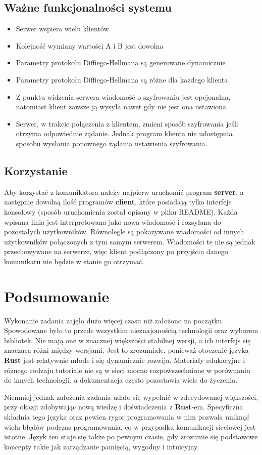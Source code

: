 \documentclass[11pt]{article}
\begin{document}
\subsection{Ważne funkcjonalności systemu}

\begin{itemize}
    \item Serwer wspiera wielu klientów
    \item Kolejność wymiany wartości A i B jest dowolna
    \item Parametry protokołu Diffiego-Hellmana są generowane dynamicznie
    \item Parametry protokołu Diffiego-Hellmana są różne dla każdego klienta
    \item Z punktu widzenia serwera wiadomość o szyfrowaniu jest opcjonalna, natomiast klient zawsze ją wysyła nawet gdy nie jest ona ustawiona
    \item Serwer, w trakcie połączenia z klientem, zmieni sposób szyfrowania jeśli otrzyma odpowiednie żądanie. Jednak program klienta nie udostępnia sposobu wysłania ponownego żądania ustawienia szyfrowania. 
\end{itemize}

\subsection{Korzystanie}

Aby korzystać z komunikatora należy najpierw uruchomić program \textbf{server}, a następnie dowolną ilość programów \textbf{client}, które posiadają tylko interfejs konsolowy (sposób uruchomienia został opisany w pliku README). Każda wpisana linia jest interpretowana jako nowa wiadomość i rozsyłana do pozostałych użytkowników. Równolegle są pokazywane wiadomości od innych użytkowników połączonych z tym samym serwerem. Wiadomości te nie są jednak przechowywane na serwerze, więc klient podłączony po przyjściu danego komunikatu nie będzie w stanie go otrzymać.

\section{Podsumowanie}

Wykonanie zadania zajęło dużo więcej czasu niż założono na początku. Spowodowane było to przede wszystkim nieznajomością technologii oraz wyborem bibliotek. Nie mają one w znacznej większości stabilnej wersji, a ich interfejs się znacząca różni między wersjami. Jest to zrozumiałe, ponieważ otoczenie języka \textbf{Rust} jest relatywnie młode i się dynamicznie rozwija. Materiały edukacyjne i różnego rodzaju tutoriale nie są w sieci mocno rozpowszechnione w porównaniu do innych technologii, a dokumentacja często pozostawia wiele do życzenia.

Niemniej jednak założenia zadania udało się wypełnić w zdecydowanej większości, przy okazji zdobywając nową wiedzę i doświadczenia z \textbf{Rust}-em. Specyficzna składnia tego języka oraz pewien rygor programowania w nim pozwala uniknąć wielu błędów podczas programowania, co w przypadku komunikacji sieciowej jest istotne. Język ten staje się także po pewnym czasie, gdy zrozumie się podstawowe koncepty takie jak zarządzanie pamięcią, wygodny i intuicyjny.
\end{document}
